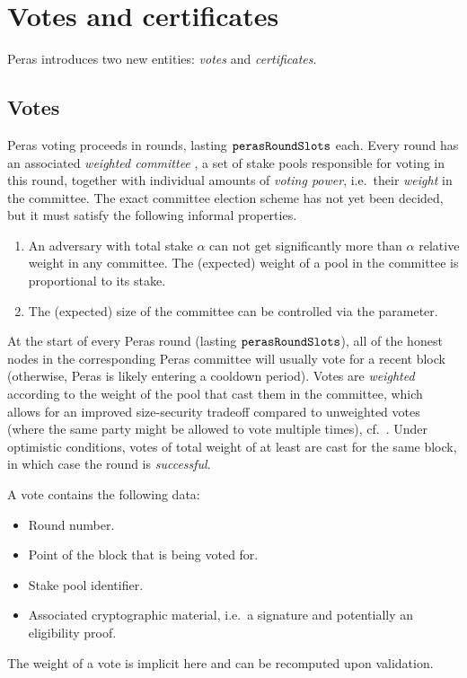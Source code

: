 \section{Votes and certificates}\label{sec:votes certificates generalities}

Peras introduces two new entities: \emph{votes} and \emph{certificates}.

\subsection{Votes}

Peras voting proceeds in rounds, lasting $\mathtt{perasRoundSlots}$ each.
Every round has an associated \emph{weighted committee} \parencite[Section~4]{gavzi2023fait}, a set of stake pools responsible for voting in this round, together with individual amounts of \emph{voting power}, i.e.\ their \emph{weight} in the committee.
The exact committee election scheme has not yet been decided, but it must satisfy the following informal properties.
\begin{enumerate}
\item
  An adversary with total stake $\alpha$ can not get significantly more than $\alpha$ relative weight in any committee.
  The (expected) weight of a pool in the committee is proportional to its stake.
\item
  The (expected) size of the committee can be controlled via the \perasN{} parameter.
\end{enumerate}

At the start of every Peras round (lasting $\mathtt{perasRoundSlots}$), all of the honest nodes in the corresponding Peras committee will usually vote for a recent block (otherwise, Peras is likely entering a cooldown period).
Votes are \emph{weighted} according to the weight of the pool that cast them in the committee, which allows for an improved size-security tradeoff compared to unweighted votes (where the same party might be allowed to vote multiple times), cf.~\cite{gavzi2023fait}.
Under optimistic conditions, votes of total weight of at least \perasQuorum{} are cast for the same block, in which case the round is \emph{successful}.

A vote contains the following data:
\begin{itemize}
\item Round number.
\item Point of the block that is being voted for.
\item Stake pool identifier.
\item Associated cryptographic material, i.e.\ a signature and potentially an eligibility proof.
\end{itemize}
The weight of a vote is implicit here and can be recomputed upon validation.

